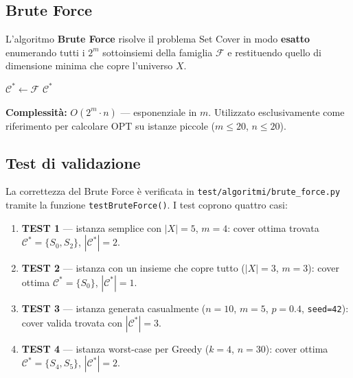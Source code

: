 \documentclass[12pt, a4paper]{article}
\begin{document}
\subsection{Brute Force}

L'algoritmo \textbf{Brute Force} risolve il problema Set Cover in modo \textbf{esatto}
enumerando tutti i $2^m$ sottoinsiemi della famiglia $\mathcal{F}$ e restituendo
quello di dimensione minima che copre l'universo $X$.


\begin{algorithm}[H]
\caption{Brute Force Set Cover - pseudocodice}
$\mathcal{C}^* \leftarrow \mathcal{F}$\;
\Return $\mathcal{C}^*$\;
\end{algorithm}

\textbf{Complessità:} $O(2^m \cdot n)$ — esponenziale in $m$.
Utilizzato esclusivamente come riferimento per calcolare $\mathrm{OPT}$ 
su istanze piccole ($m \leq 20$, $n \leq 20$).

\subsection*{Test di validazione}

La correttezza del Brute Force è verificata in \texttt{test/algoritmi/brute\_force.py} 
tramite la funzione \texttt{testBruteForce()}. I test coprono quattro casi:

\begin{enumerate}
    \item \textbf{TEST 1} — istanza semplice con $|X|=5$, $m=4$: 
    cover ottima trovata $\mathcal{C}^* = \{S_0, S_2\}$, $|\mathcal{C}^*| = 2$.

    \item \textbf{TEST 2} — istanza con un insieme che copre tutto ($|X|=3$, $m=3$): 
    cover ottima $\mathcal{C}^* = \{S_0\}$, $|\mathcal{C}^*| = 1$.

    \item \textbf{TEST 3} — istanza generata casualmente ($n=10$, $m=5$, $p=0.4$, 
    \texttt{seed=42}): cover valida trovata con $|\mathcal{C}^*| = 3$.

    \item \textbf{TEST 4} — istanza worst-case per Greedy ($k=4$, $n=30$): 
    cover ottima $\mathcal{C}^* = \{S_4, S_5\}$, $|\mathcal{C}^*| = 2$.
\end{enumerate}
\end{document}
